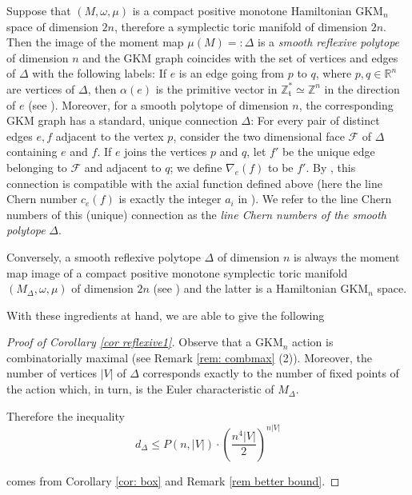 \documentclass[12pt,a4paper]{amsart}
\newcommand{\RR}{\mathbb{R}}
\newcommand{\ZZ}{\mathbb{Z}}
\theoremstyle{plain}
\theoremstyle{definition}
\begin{document}
Suppose that $(M,\omega,\mu)$ is a compact positive monotone Hamiltonian GKM$_n$ space of dimension $2n$, therefore
a symplectic toric manifold of dimension $2n$.
Then the image of the moment map $\mu(M)=:\Delta$ is a \textit{smooth reflexive polytope} of dimension $n$ and the GKM graph coincides
with the set of vertices and edges of $\Delta$ with the following labels: If $e$ is an edge going from $p$ to $q$, where
$p,q\in \RR^n$ are vertices of $\Delta$, then $\alpha(e)$ is the primitive vector in $\ZZ_{\mathfrak{t}}^*\simeq \ZZ^n$ in the direction of $e$
(see \cite{MR3695881}). Moreover, for a smooth polytope of dimension $n$, the
corresponding GKM graph has a standard, unique connection $\Delta$: For every pair of
distinct edges $e,f$ adjacent to the vertex $p$, consider the two
dimensional face $\mathcal{F}$ of $\Delta$ containing $e$ and $f$. If $e$ joins the
vertices $p$ and $q$, let $f'$ be the unique edge belonging to $\mathcal{F}$ and
adjacent to $q$;  we define $\nabla_e(f)$ to be $f'$. By
\cite[Proposition 2.4]{MR3695881}, this connection is compatible with the axial function
defined above (here the line Chern number $c_e(f)$ is exactly the integer $a_i$ in
\cite[Proposition 2.4]{MR3695881}). 
We refer to the line Chern numbers of this (unique) connection as the \emph{line Chern numbers of the smooth polytope} $\Delta$. 

Conversely, a smooth reflexive polytope $\Delta$ of dimension $n$ is always the moment map image of a compact positive monotone
symplectic toric manifold $(M_\Delta,\omega,\mu)$ of dimension $2n$ (see \cite[Proposition 3.10]{MR3695881}) and the latter is a Hamiltonian GKM$_n$ space.

With these ingredients at hand, we are able to give the following

\begin{proof}[Proof of Corollary \ref{cor reflexive1}]\label{proof of cor intro}
Observe that a GKM$_n$ action is combinatorially maximal (see Remark \ref{rem: combmax} (2)).
Moreover, the number of vertices $|V|$ of $\Delta$ corresponds exactly to the number of fixed points of the action which, in turn, is the
Euler characteristic of $M_\Delta$.

Therefore the inequality 
\begin{equation}\label{upper bound d refl}
d_\Delta \leq P(n,|V|)\cdot\left(\frac{n^4|V|}{2}\right)^{n|V|}
\end{equation}


 comes from Corollary \ref{cor: box} and Remark \ref{rem better bound}.
\end{proof}
\end{document}
